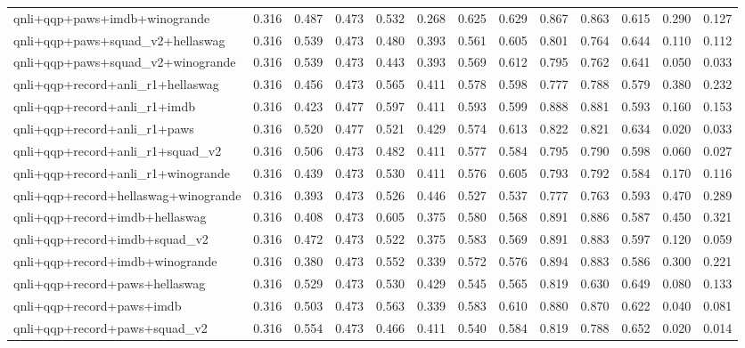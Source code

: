 \begin{table}[t]
\begin{tabular}{lrrrrrrrrrrrr}
    qnli+qqp+paws+imdb+winogrande & 0.316 & 0.487 & 0.473 & 0.532 & 0.268 & 0.625 & 0.629 & 0.867 & 0.863 & 0.615 & 0.290 & 0.127 \\
    qnli+qqp+paws+squad\_v2+hellaswag & 0.316 & 0.539 & 0.473 & 0.480 & 0.393 & 0.561 & 0.605 & 0.801 & 0.764 & 0.644 & 0.110 & 0.112 \\
    qnli+qqp+paws+squad\_v2+winogrande & 0.316 & 0.539 & 0.473 & 0.443 & 0.393 & 0.569 & 0.612 & 0.795 & 0.762 & 0.641 & 0.050 & 0.033 \\
    qnli+qqp+record+anli\_r1+hellaswag & 0.316 & 0.456 & 0.473 & 0.565 & 0.411 & 0.578 & 0.598 & 0.777 & 0.788 & 0.579 & 0.380 & 0.232 \\
    qnli+qqp+record+anli\_r1+imdb & 0.316 & 0.423 & 0.477 & 0.597 & 0.411 & 0.593 & 0.599 & 0.888 & 0.881 & 0.593 & 0.160 & 0.153 \\
    qnli+qqp+record+anli\_r1+paws & 0.316 & 0.520 & 0.477 & 0.521 & 0.429 & 0.574 & 0.613 & 0.822 & 0.821 & 0.634 & 0.020 & 0.033 \\
    qnli+qqp+record+anli\_r1+squad\_v2 & 0.316 & 0.506 & 0.473 & 0.482 & 0.411 & 0.577 & 0.584 & 0.795 & 0.790 & 0.598 & 0.060 & 0.027 \\
    qnli+qqp+record+anli\_r1+winogrande & 0.316 & 0.439 & 0.473 & 0.530 & 0.411 & 0.576 & 0.605 & 0.793 & 0.792 & 0.584 & 0.170 & 0.116 \\
    qnli+qqp+record+hellaswag+winogrande & 0.316 & 0.393 & 0.473 & 0.526 & 0.446 & 0.527 & 0.537 & 0.777 & 0.763 & 0.593 & 0.470 & 0.289 \\
    qnli+qqp+record+imdb+hellaswag & 0.316 & 0.408 & 0.473 & 0.605 & 0.375 & 0.580 & 0.568 & 0.891 & 0.886 & 0.587 & 0.450 & 0.321 \\
    qnli+qqp+record+imdb+squad\_v2 & 0.316 & 0.472 & 0.473 & 0.522 & 0.375 & 0.583 & 0.569 & 0.891 & 0.883 & 0.597 & 0.120 & 0.059 \\
    qnli+qqp+record+imdb+winogrande & 0.316 & 0.380 & 0.473 & 0.552 & 0.339 & 0.572 & 0.576 & 0.894 & 0.883 & 0.586 & 0.300 & 0.221 \\
    qnli+qqp+record+paws+hellaswag & 0.316 & 0.529 & 0.473 & 0.530 & 0.429 & 0.545 & 0.565 & 0.819 & 0.630 & 0.649 & 0.080 & 0.133 \\
    qnli+qqp+record+paws+imdb & 0.316 & 0.503 & 0.473 & 0.563 & 0.339 & 0.583 & 0.610 & 0.880 & 0.870 & 0.622 & 0.040 & 0.081 \\
    qnli+qqp+record+paws+squad\_v2 & 0.316 & 0.554 & 0.473 & 0.466 & 0.411 & 0.540 & 0.584 & 0.819 & 0.788 & 0.652 & 0.020 & 0.014 \\

\end{tabular}
\end{table}
